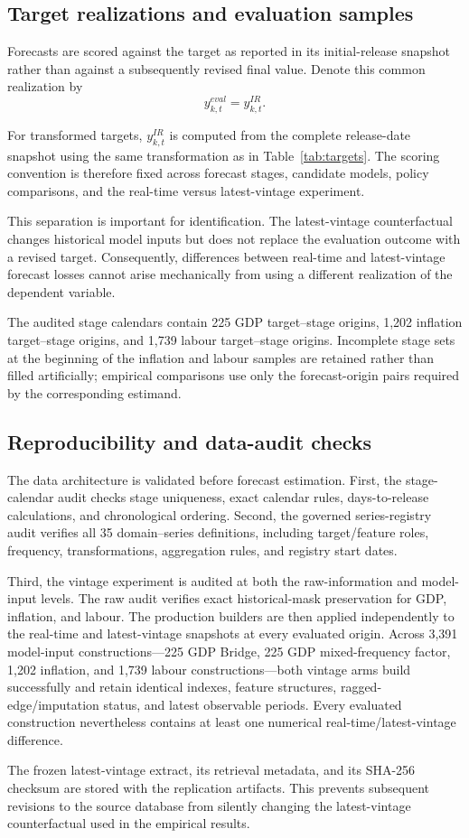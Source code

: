 \subsection{Target realizations and evaluation samples}
\label{subsec:samples}

Forecasts are scored against the target as reported in its initial-release
snapshot rather than against a subsequently revised final value. Denote this
common realization by
\begin{equation}
    y^{eval}_{k,t}
    =
    y^{IR}_{k,t}.
    \label{eq:initial_release_actual}
\end{equation}

For transformed targets, $y^{IR}_{k,t}$ is computed from the complete
release-date snapshot using the same transformation as in
Table~\ref{tab:targets}. The scoring convention is therefore fixed across
forecast stages, candidate models, policy comparisons, and the real-time
versus latest-vintage experiment.

This separation is important for identification. The latest-vintage
counterfactual changes historical model inputs but does not replace the
evaluation outcome with a revised target. Consequently, differences between
real-time and latest-vintage forecast losses cannot arise mechanically from
using a different realization of the dependent variable.

The audited stage calendars contain 225 GDP target--stage origins, 1,202
inflation target--stage origins, and 1,739 labour target--stage origins.
Incomplete stage sets at the beginning of the inflation and labour samples
are retained rather than filled artificially; empirical comparisons use only
the forecast-origin pairs required by the corresponding estimand.

\subsection{Reproducibility and data-audit checks}

The data architecture is validated before forecast estimation. First, the
stage-calendar audit checks stage uniqueness, exact calendar rules,
days-to-release calculations, and chronological ordering. Second, the
governed series-registry audit verifies all 35 domain--series definitions,
including target/feature roles, frequency, transformations, aggregation
rules, and registry start dates.

Third, the vintage experiment is audited at both the raw-information and
model-input levels. The raw audit verifies exact historical-mask preservation
for GDP, inflation, and labour. The production builders are then applied
independently to the real-time and latest-vintage snapshots at every evaluated
origin. Across 3,391 model-input constructions---225 GDP Bridge, 225 GDP
mixed-frequency factor, 1,202 inflation, and 1,739 labour
constructions---both vintage arms build successfully and retain identical
indexes, feature structures, ragged-edge/imputation status, and latest
observable periods. Every evaluated construction nevertheless contains at
least one numerical real-time/latest-vintage difference.

The frozen latest-vintage extract, its retrieval metadata, and its SHA-256
checksum are stored with the replication artifacts. This prevents subsequent
revisions to the source database from silently changing the latest-vintage
counterfactual used in the empirical results.